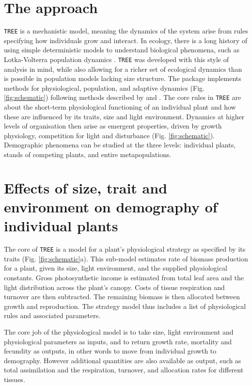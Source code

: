 \documentclass[a4paper,11pt]{article}
\begin{document}
\section{The approach}

\texttt{TREE} is a mechanistic model, meaning the dynamics of the system arise
from rules specifying how individuals grow and interact. In ecology,
there is a long history of using simple deterministic models
to understand biological phenomena, such as Lotka-Volterra population dynamics
\citep{MacArthur-1967, Leimar-2013} .
\texttt{TREE} was developed with this style of analysis in mind, while also
allowing for a richer set of ecological dynamics than is possible in
population models lacking size structure. The package implements methods
for physiological, population, and adaptive dynamics (Fig.
\ref{fig:schematic}) following methods described by \citet{Falster-2011}
and \citet{Falster-2015}. The core rules in \texttt{TREE} are about the
short-term physiological functioning of an individual plant and how
these are influenced by its traits, size and light environment. Dynamics
at higher levels of organisation then arise as emergent properties,
driven by growth physiology, competition for light and disturbance (Fig.
\ref{fig:schematic}). Demographic phenomena can be studied at the three
levels: individual plants, stands of competing plants, and entire
metapopulations.

\section{Effects of size, trait and environment on demography of individual plants}

The core of \texttt{TREE} is a model for a plant's physiological strategy as
specified by its traits (Fig. \ref{fig:schematic}a). This sub-model
estimates rate of biomass production for a plant, given its size, light
environment, and the supplied physiological constants. Gross photosynthetic 
income is
estimated from total leaf area and the light distribution across the
plant's canopy. Costs of tissue respiration and turnover are then
subtracted. The remaining biomass is then allocated between growth and
reproduction. The strategy model thus includes a list of physiological
rules and associated parameters.

The core job of the physiological model is to take size, light
environment and physiological parameters as inputs, and to return growth rate,
mortality and fecundity as outputs, in other words to move from
individual growth to demography. However additional quantities are also
available as output, such as total assimilation and the respiration,
turnover, and allocation rates for different tissues.
\end{document}
